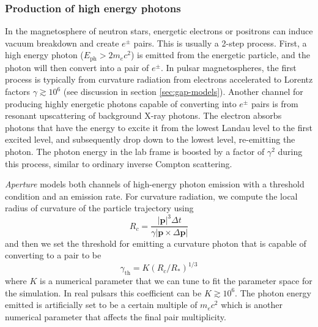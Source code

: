 \subsubsection{Production of high energy photons}
\label{sec:instant-pair}

In the magnetosphere of neutron stars, energetic electrons or positrons can
induce vacuum breakdown and create $e^{\pm}$ pairs. This is usually a 2-step
process. First, a high energy photon ($E_\mathrm{ph} > 2m_{e}c^2$) is emitted
from the energetic particle, and the photon will then convert into a pair of
$e^{\pm}$. In pulsar magnetospheres, the first process is typically from
curvature radiation from electrons accelerated to Lorentz factors $\gamma
\gtrsim 10^{6}$ (see discussion in section \ref{sec:gap-models}). Another
channel for producing highly energetic photons capable of converting into
$e^{\pm}$ pairs is from resonant upscattering of background X-ray photons. The
electron absorbs photons that have the energy to excite it from the lowest
Landau level to the first excited level, and subsequently drop down to the
lowest level, re-emitting the photon. The photon energy in the lab frame is
boosted by a factor of $\gamma^2$ during this process, similar to ordinary
inverse Compton scattering.


{\it Aperture} models both channels of high-energy photon emission with a threshold
condition and an emission rate. For curvature radiation, we compute the local
radius of curvature of the particle trajectory using
\begin{equation}
  \label{eq:curvature-radius}
  R_{c} = \frac{|\mathbf{p}|^3\Delta t}{\gamma \left| \mathbf{p} \times \Delta \mathbf{p} \right|}
\end{equation}
and then we set the threshold for emitting a curvature photon that is capable of
converting to a pair to be
\begin{equation}
  \label{eq:curvature-threshold}
  \gamma_\mathrm{th} = K(R_{c}/R_{*})^{1/3}
\end{equation}
where $K$ is a numerical parameter that we can tune to fit the parameter space
for the simulation. In real pulsars this coefficient can be $K\gtrsim 10^{6}$.
The photon energy emitted is artificially set to be a certain multiple of
$m_{e}c^2$ which is another numerical parameter that affects the final pair
multiplicity.

